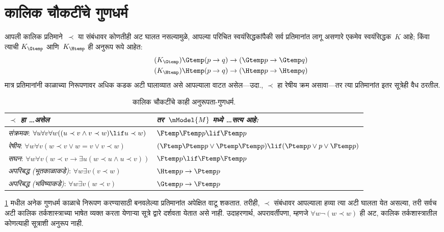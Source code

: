 \section{कालिक चौकटींचे गुणधर्म}\label{aml:tl:acc:sec}
आपली कालिक प्रतिमाने~$\prec$ या संबंधावर कोणतीही
अट घालत नसल्यामुळे, आपल्या परिचित स्वयंसिद्धकांपैकी
सर्व प्रतिमानांत लागू असणारे एकमेव स्वयंसिद्धक~$K$
आहे; किंवा त्याची $K_{\Gtemp}$ आणि~$K_{\Htemp}$
ही अनुरूप रूपे आहेत:
\begin{align*}
\tag{$K_{\Gtemp}$}  \Gtemp (p \to q) & \to (\Gtemp p \to \Gtemp q)\\
\tag{$K_{\Htemp}$}  \Htemp (p \to q) & \to (\Htemp p \to \Htemp q)
\end{align*}
मात्र प्रतिमानांनी काळाच्या निरूपणावर अधिक कडक
अटी घालाव्यात असे आपल्याला वाटत असेल—उदा.,
$\prec$ हा रेषीय क्रम असावा—तर त्या प्रतिमानांत
इतर सूत्रेही वैध ठरतील.
\begin{table}[t]
  \begin{tabular}{| p{} || p{} |}
    \hline
    {\emph{$\prec$ हा \dots असेल}} & {\emph{तर~$\mModel{M}$ मध्ये \dots सत्य आहे:}} \\
    \hline \hline
    \emph{संक्रमक}: \newline
    $\forall u \forall v \forall w ((u \prec v \land v \prec w) \lif u \prec w)$ &
    $\Ftemp \Ftemp p \lif \Ftemp p$  \\
    \hline
    \emph{रेषीय}: \newline
    $\forall w \forall v (w \prec v \lor w = v \lor v \prec w)$ &
    $(\Ftemp \Ptemp  p \lor \Ptemp \Ftemp p) \lif (\Ptemp p \lor p \lor \Ftemp p)$\\
    \hline
    \emph{सघन}: \newline
    $\forall w \forall v (w \prec v \to \exists u(w \prec u \land u \prec v))$ &
    $\Ftemp p \lif \Ftemp \Ftemp p$ \\
    \hline
    \emph{अपरिबद्ध (भूतकाळाकडे)}: \newline
    $\forall w \exists v( v \prec w)$ &
    $\Htemp p \to \Ptemp p$ \\
    \hline
    \emph{अपरिबद्ध (भविष्याकडे)}: \newline
    $\forall w \exists v( w \prec v)$ &
    $\Gtemp p \to \Ftemp p$ \\
    \hline
  \end{tabular}
  \caption{कालिक चौकटींचे काही अनुरूपता-गुणधर्म.}
  \label{aml:tl:acc:tab:correspondence}
\end{table}
\ref{aml:tl:acc:tab:correspondence} मधील अनेक गुणधर्म काळाचे
निरूपण करण्यासाठी बनवलेल्या प्रतिमानांत अपेक्षित
वाटू शकतात. तरीही, $\prec$ संबंधावर आपल्याला
हव्या त्या अटी घालता येत असल्या, तरी सर्वच अटी
कालिक तर्कशास्त्राच्या भाषेत व्यक्त करता येणाऱ्या
सूत्रे द्वारे दर्शवता येतात असे नाही. उदाहरणार्थ,
अपरावर्तीपणा, म्हणजे $\forall w \lnot (w \prec w)$
ही अट, कालिक तर्कशास्त्रातील कोणत्याही सूत्राशी
अनुरूप नाही.
